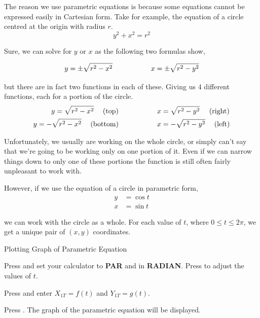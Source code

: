 \documentclass[11pt,a4paper]{book}
\begin{document}
The reason we use parametric equations is because some equations cannot be expressed easily in Cartesian form. Take for example, the equation of a circle centred at the origin with radius $r$.
\[
y^{2}+x^{2}=r^{2}
\]

Sure, we can solve for $y$ or $x$ as the following two formulas show,

\[
y=\pm\sqrt{{r^{2}}-{x^{2}}}\hspace{0.5in}\hspace{0.25in}x=\pm\sqrt{{r^{2}}-{y^{2}}}
\]

but there are in fact two functions in each of these. Giving us $4$
different functions, each for a portion of the circle.
\begin{align*}
y=\sqrt{{r^{2}}-{x^{2}}}\hspace{0.15in}\left({\mbox{top}}\right) & \hspace{0.75in}x=\sqrt{{r^{2}}-{y^{2}}}\hspace{0.16in}\left({\mbox{right}}\right)\\
y=-\sqrt{{r^{2}}-{x^{2}}}\hspace{0.15in}\left({\mbox{bottom}}\right) & \hspace{0.75in}x=-\sqrt{{r^{2}}-{y^{2}}}\hspace{0.15in}\left({\mbox{left}}\right)
\end{align*}

Unfortunately, we usually are working on the whole circle, or simply
can\textquoteright t say that we\textquoteright re going to be working
only on one portion of it. Even if we can narrow things down to only
one of these portions the function is still often fairly unpleasant
to work with.

However, if we use the equation of a circle in parametric form,
\begin{align*}
y & =\cos t\\
x & =\sin t
\end{align*}

we can work with the circle as a whole. For each value of $t$, where
$0\leq t\leq2\pi$, we get a unique pair of $(x,y)$ coordinates.



\begin{GC}{Plotting Graph of Parametric Equation}
\begin{steps}
\item Press  and set your calculator to \textbf{PAR} and in \textbf{RADIAN}. Press  to adjust the values of $t$.
\item Press  and enter $X_{1T}=f\left(t\right)$ and $Y_{1T}=g\left(t\right)$.
\item Press . The graph of the parametric equation will be displayed.
\end{steps}
\end{GC}
\end{document}
